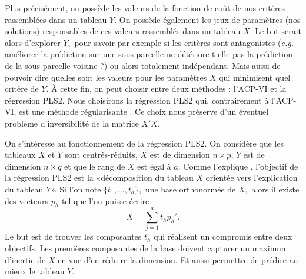 Plus précisément, on possède les valeurs de la fonction de coût de nos critères rassemblées dans un tableau $Y$.
On possède également les jeux de paramètres (nos solutions) responsables de ces valeurs rassemblés dans un tableau $X$.
Le but serait alors d'explorer $Y,$ pour savoir par exemple si les critères sont antagonistes (\emph{e.g.} améliorer la prédiction sur une sous-parcelle ne détériore-t-elle pas la prédiction de la sous-parcelle voisine ?) ou alors totalement indépendant.
Mais aussi de pouvoir dire quelles sont les valeurs pour les paramètres $X$ qui minimisent quel critère de $Y$. 
À cette fin, on peut choisir entre deux méthodes : l'ACP-VI  et la régression PLS2.
Nous choisirons la régression PLS2 qui, contrairement à l'ACP-VI, est une méthode régularisante \citep{bry}.
Ce choix nous préserve d'un éventuel problème d'inversibilité de la matrice $X'X$.

On s'intéresse au fonctionnement de la régression PLS2. 
On considère que les tableaux $X$ et $Y$ sont centrés-réduits, $X$ est de dimension $n\times p$, $Y$ est de dimension $n\times q$ et que le rang de $X$ est égal à $a$.
Comme l'explique \citet{tenenhaus}, l'objectif de la régression PLS2 est la «décomposition du tableau $X$ orientée vers l'explication du tableau $Y$».
Si l'on note $\{t_1,\ldots, t_a\},$ une base orthonormée de $X,$ alors il existe des vecteurs $p_h$ tel que l'on puisse écrire
\[
X = \sum_{j = 1}^a t_h p_h'.
\]
Le but est de trouver les composantes $t_h$ qui réalisent un compromis entre deux objectifs. 
Les premières composantes de la base doivent capturer un maximum d'inertie de $X$ en vue d'en réduire la dimension.
Et aussi permettre de prédire au mieux le tableau $Y.$


